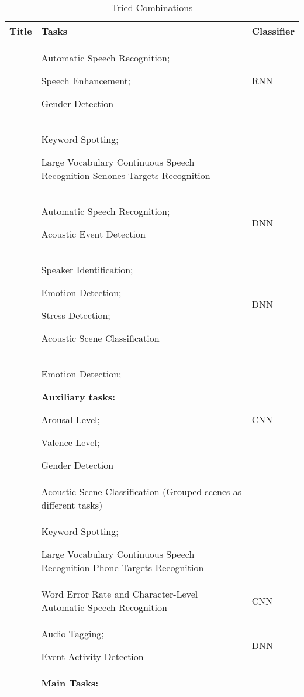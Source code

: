 		\begin{table}[ht]
		\caption{Tried Combinations} %
		\centering %
		\begin{tabular}{p{}p{}p{}} %
			\hline\hline %
			Title & Tasks & Classifier   \\ [0.5ex] %
			\hline %
			\citet{lu2004multitask} & Automatic Speech Recognition;
			
			Speech Enhancement;
			
			Gender Detection & RNN \\ \hline
			\citet{panchapagesan2016multi} & Keyword Spotting; 
			
			Large Vocabulary Continuous Speech Recognition Senones Targets Recognition & \\ \hline
			\citet{sakti2016deep} & Automatic Speech Recognition; 
			
			Acoustic Event Detection & DNN \\ \hline
			\citet{georgiev2017heterogeneous} \citet{georgiev2017low} & Speaker Identification; 
			
			Emotion Detection; 
			
			Stress Detection; 
			
			Acoustic Scene Classification & DNN \\ \hline
			\citet{kim2017speech} & Emotion Detection; 
			
			\textbf{Auxiliary tasks:} 
			
			Arousal Level; 
			
			Valence Level; 
			
			Gender Detection & CNN \\ \hline
			\citet{nwe2017convolutional} & Acoustic Scene Classification (Grouped scenes as different tasks) & \\ \hline
			\citet{sun2017compressed} & Keyword Spotting; 
			
			Large Vocabulary Continuous Speech Recognition Phone Targets Recognition & \\ \hline
			\citet{kremer2018inductive} & Word Error Rate and Character-Level Automatic Speech Recognition & CNN \\ \hline
			\citet{morfi2018deep} & Audio Tagging; 
			
			Event Activity Detection & DNN \\ \hline
			\citet{lee2019label} & \textbf{Main Tasks:}
			

\end{tabular}
\end{table}
